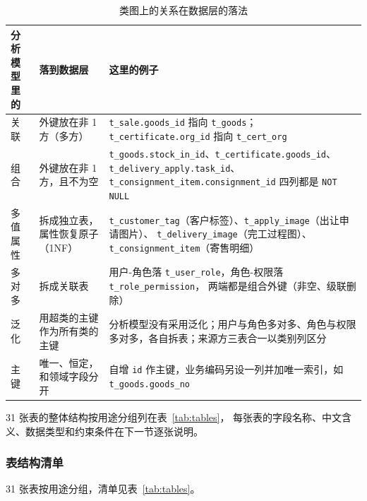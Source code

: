 \documentclass[12pt, a4paper]{ctexart}
\newcommand{\code}[1]{\texttt{\small #1}}
\begin{document}
\begin{table}[H]
\centering
\small
\caption{类图上的关系在数据层的落法}
\label{tab:map-rules}
\begin{tabularx}{\textwidth}{@{}p{3.4cm} p{4.0cm} X@{}}
\toprule
分析模型里的 & 落到数据层 & 这里的例子 \\
\midrule
关联 & 外键放在非 1 方（多方） &
\code{t\_sale.goods\_id} 指向 \code{t\_goods}；
\code{t\_certificate.org\_id} 指向 \code{t\_cert\_org} \\
组合 & 外键放在非 1 方，且不为空 &
\code{t\_goods.stock\_in\_id}、\code{t\_certificate.goods\_id}、
\code{t\_delivery\_apply.task\_id}、\code{t\_consignment\_item.consignment\_id} 四列都是 \code{NOT NULL} \\
多值属性 & 拆成独立表，属性恢复原子（1NF） &
\code{t\_customer\_tag}（客户标签）、\code{t\_apply\_image}（出让申请图片）、
\code{t\_delivery\_image}（完工过程图）、\code{t\_consignment\_item}（寄售明细） \\
多对多 & 拆成关联表 &
用户-角色落 \code{t\_user\_role}，角色-权限落 \code{t\_role\_permission}，
两端都是组合外键（非空、级联删除） \\
泛化 & 用超类的主键作为所有类的主键 &
分析模型没有采用泛化；用户与角色多对多、角色与权限多对多，各自拆表；来源方三表合一以类别列区分 \\
主键 & 唯一、恒定，和领域字段分开 &
自增 \code{id} 作主键，业务编码另设一列并加唯一索引，如 \code{t\_goods.goods\_no} \\
\bottomrule
\end{tabularx}
\end{table}

31 张表的整体结构按用途分组列在表~\ref{tab:tables}，
每张表的字段名称、中文含义、数据类型和约束条件在下一节逐张说明。

\subsubsection{表结构清单}

31 张表按用途分组，清单见表~\ref{tab:tables}。
\end{document}
